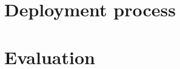 \section{Deployment process} \label{sec:sb-process}

\section{Evaluation} \label{sec:sb-evaluation}
